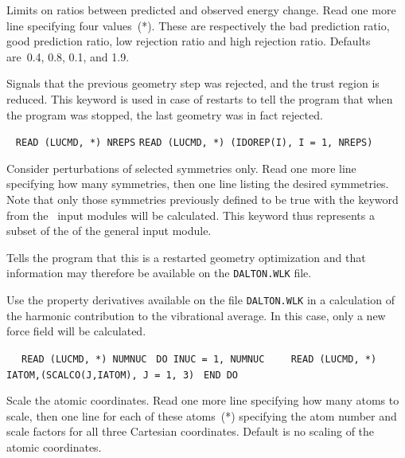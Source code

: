 \begin{description}
Limits on ratios between predicted and
observed energy change.  Read one more line specifying four
values~(*).  These are respectively the bad prediction ratio, good
prediction ratio, low rejection ratio and high rejection ratio.
Defaults are~0.4, 0.8, 0.1, and 1.9.

\item[\Key{REJECT}] Signals that the previous geometry step was
rejected, and the trust
region is
reduced. This keyword is
used in case of restarts to tell the program that when the program
was stopped, the last geometry was in fact rejected.

\item[\Key{REPS}]\verb| |\newline
\verb|READ (LUCMD, *) NREPS|\newline
\verb|READ (LUCMD, *) (IDOREP(I), I = 1, NREPS)|

Consider perturbations of selected
symmetries only.  Read one more line specifying how many
symmetries, then one line listing the desired symmetries. Note that
only those symmetries previously defined to be true with the keyword
 from the \aba\ input modules will be calculated. This
keyword thus represents a subset of the  of the general
input module.

\item[\Key{RESTART}] Tells the program that this is a restarted
geometry optimization and that
information may therefore be available
on the \verb|DALTON.WLK| file.

\item[\Key{REUSE}] Use the property derivatives available on the file
\verb|DALTON.WLK| in a calculation of the harmonic contribution to the
vibrational average. In this case, only a new force field will be calculated.

\item[\Key{SCALE}]\verb| |\newline
\verb| READ (LUCMD, *) NUMNUC|\newline
\verb| DO INUC = 1, NUMNUC|\newline
\verb|    READ (LUCMD, *) IATOM,(SCALCO(J,IATOM), J = 1, 3)|\newline
\verb| END DO|

Scale the atomic coordinates.  Read one more
line specifying how many atoms to scale, then one line for
each of these atoms~(*) specifying the atom number and scale
factors for all three Cartesian coordinates. Default is no scaling of
the atomic coordinates.


\end{description}
